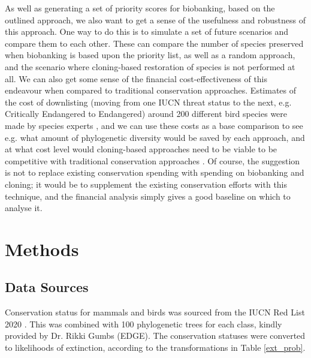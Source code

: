 \documentclass[10pt]{article}
\begin{document}
	As well as generating a set of priority scores for biobanking, based on the
	outlined approach, we also want to get a sense of the usefulness and
	robustness of this approach. One way to do this is to simulate a set of future
	scenarios and compare them to each other. These can compare the number of species
	preserved when biobanking is based upon the priority list, as well as a random
	approach, and the scenario where cloning-based restoration of species is not
	performed at all. We can also get some sense of the financial cost-effectiveness of
	this endeavour when compared to traditional conservation approaches. Estimates of the
	cost of downlisting (moving from one IUCN threat status to the next, e.g. Critically
	Endangered to Endangered) around 200 different bird species were made by
	species experts \cite{mccarthyFinancialCostsMeeting2012}, and we can use these costs as a base comparison to see e.g. what
	amount of phylogenetic diversity would be saved by each approach, and at what
	cost level would cloning-based approaches need to be viable to be competitive
	with traditional conservation approaches \cite{nunesPriceConservingAvian2015}. Of course, the suggestion is not to replace
	existing conservation spending with spending on biobanking and cloning; it would
	be to supplement the existing conservation efforts with this technique, and the
	financial analysis simply gives a good baseline on which to analyse it.

	
	
	
	\section{Methods}
	\subsection{Data Sources}
	Conservation status for mammals and birds was sourced from the IUCN Red List 2020 \cite{iucnIUCNRedList2021, IUCNRedList2012}. This was combined with 100 phylogenetic trees for each class, kindly provided by Dr. Rikki Gumbs (EDGE). The conservation statuses were converted to likelihoods of extinction, according to the transformations in Table \ref{ext_prob}.
	
\end{document}
